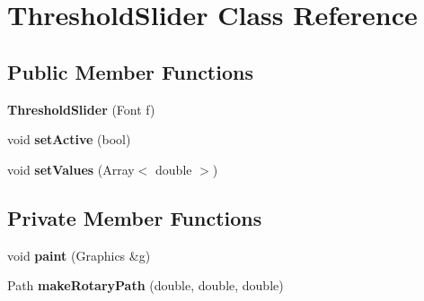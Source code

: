 \hypertarget{classThresholdSlider}{\section{Threshold\-Slider Class Reference}
\label{classThresholdSlider}
}
\subsection*{Public Member Functions}
\begin{DoxyCompactItemize}
\item 
\hypertarget{classThresholdSlider_a5398c8e3554363cd303fa92882316ffd}{{\bfseries Threshold\-Slider} (Font f)}\label{classThresholdSlider_a5398c8e3554363cd303fa92882316ffd}

\item 
\hypertarget{classThresholdSlider_ac83ea11e9500f031115e483b24e1a5c7}{void {\bfseries set\-Active} (bool)}\label{classThresholdSlider_ac83ea11e9500f031115e483b24e1a5c7}

\item 
\hypertarget{classThresholdSlider_a9f1539033db04ee192efd8797c6de47e}{void {\bfseries set\-Values} (Array$<$ double $>$)}\label{classThresholdSlider_a9f1539033db04ee192efd8797c6de47e}

\end{DoxyCompactItemize}
\subsection*{Private Member Functions}
\begin{DoxyCompactItemize}
\item 
\hypertarget{classThresholdSlider_a61dc99677aec47179be42eb57f6f27d8}{void {\bfseries paint} (Graphics \&g)}\label{classThresholdSlider_a61dc99677aec47179be42eb57f6f27d8}

\item 
\hypertarget{classThresholdSlider_a7c3fe6e93477cb6280c44dd8dde8ccc8}{Path {\bfseries make\-Rotary\-Path} (double, double, double)}\label{classThresholdSlider_a7c3fe6e93477cb6280c44dd8dde8ccc8}

\end{DoxyCompactItemize}
